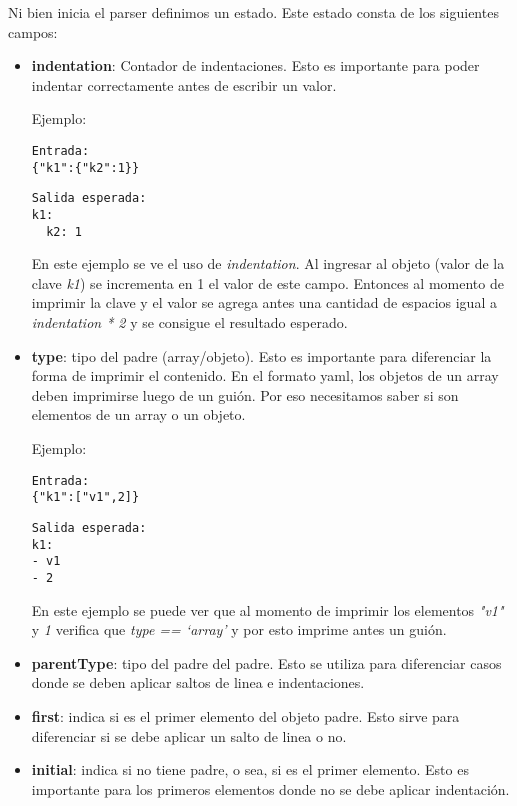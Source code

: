 Ni bien inicia el parser definimos un estado. Este estado consta de los siguientes campos:

\begin{itemize}
    \item \textbf{indentation}: Contador de indentaciones. Esto es importante para poder indentar correctamente antes de escribir un valor.
    \par Ejemplo:
    \begin{verbatim}
Entrada:
{"k1":{"k2":1}}
    \end{verbatim}
    \begin{verbatim}
Salida esperada:
k1:
  k2: 1
    \end{verbatim}
    En este ejemplo se ve el uso de \textit{indentation}. Al ingresar al objeto (valor de la clave \textit{k1}) se incrementa en 1 el valor de este campo. Entonces al momento de imprimir la clave  y el valor  se agrega antes una cantidad de espacios igual a \textit{indentation * 2} y se consigue el resultado esperado.

    \item \textbf{type}: tipo del padre (array/objeto). Esto es importante para diferenciar la forma de imprimir el contenido. En el formato yaml, los objetos de un array deben imprimirse luego de un guión. Por eso necesitamos saber si son elementos de un array o un objeto.
    \par Ejemplo:
    \begin{verbatim}
Entrada:
{"k1":["v1",2]}
    \end{verbatim}
    \begin{verbatim}
Salida esperada:
k1:
- v1
- 2
    \end{verbatim}
    En este ejemplo se puede ver que al momento de imprimir los elementos \textit{"v1"} y \textit{1} verifica que \textit{type == `array'} y por esto imprime antes un guión.

    \item \textbf{parentType}: tipo del padre del padre. Esto se utiliza para diferenciar casos donde se deben aplicar saltos de linea e indentaciones.
    \item \textbf{first}: indica si es el primer elemento del objeto padre. Esto sirve para diferenciar si se debe aplicar un salto de linea o no.
    \item \textbf{initial}: indica si no tiene padre, o sea, si es el primer elemento. Esto es importante para los primeros elementos donde no se debe aplicar indentación.
\end{itemize}

